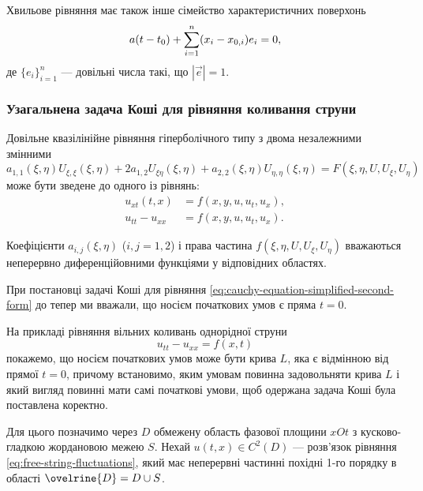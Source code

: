 Хвильове рівняння має також інше сімейство характеристичних поверхонь
\begin{equation}
    a (t - t_0) + \displaystyle\sum\limits_{i = 1}^n (x_i - x_{0,i}) e_i = 0,
\end{equation}
де $\{e_i\}_{i = 1}^n$ --- довільні числа такі, що $|\vec e| = 1$.

\subsubsection{Узагальнена задача Коші для рівняння коливання струни}

Довільне квазілінійне рівняння гіперболічного типу з двома незалежними змінними
\begin{equation}
    a_{1, 1} (\xi, \eta) U_{\xi, \xi} (\xi, \eta) + 2 a_{1, 2} U_{\xi \eta}(\xi, \eta) + a_{2, 2} (\xi, \eta) U_{\eta, \eta}(\xi, \eta) = F(\xi, \eta, U, U_\xi, U_\eta)
\end{equation}
може бути зведене до одного із рівнянь:
\begin{align}
    u_{xt}(t,x) &= f(x, y, u, u_t, u_x), \\
    \label{eq:cauchy-equation-simplified-second-form}
    u_{tt} - u_{xx} &= f(x, y, u, u_t, u_x).
\end{align}

\begin{remark}
    Коефіцієнти $a_{i,j}(\xi,\eta)$ ($i, j = 1, 2$) і права частина $f(\xi, \eta, U, U_\xi, U_\eta)$ вважаються неперервно диференційовними функціями у відповідних областях.
\end{remark}

При постановці задачі Коші для рівняння \eqref{eq:cauchy-equation-simplified-second-form} до тепер ми вважали, що носієм початкових умов є пряма $t = 0$. \medskip

На прикладі рівняння вільних коливань однорідної струни
\begin{equation}
    \label{eq:free-string-fluctuations}
    u_{tt} - u_{xx} = f(x, t)
\end{equation}
покажемо, що носієм початкових умов може бути крива $L$, яка є відмінною від прямої $t = 0$, причому встановимо, яким умовам повинна задовольняти крива $L$ і який вигляд повинні мати самі початкові умови, щоб одержана задача Коші була поставлена коректно. \medskip

Для цього позначимо через $D$ обмежену область фазової площини $xOt$ з кусково-гладкою жордановою межею $S$. Нехай $u(t, x) \in C^2(D)$ --- розв'язок рівняння \eqref{eq:free-string-fluctuations}, який має неперервні частинні похідні 1-го порядку в області $\ovelrine{D} = D \cup S$. \medskip

